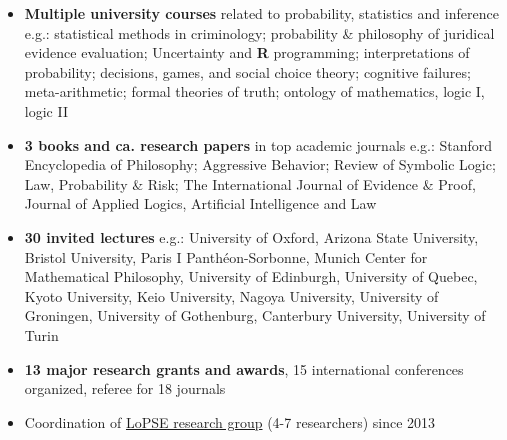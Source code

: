 \documentclass[10pt, a4paper]{article}
\begin{document}
\vspace{-6mm}

\begin{itemize}[leftmargin=*]
	 \setlength{\itemsep}{0pt}\scriptsize
	\item \normalsize  \textbf{Multiple university courses} related to probability, statistics and inference
	\newline
	\scriptsize e.g.: statistical methods in criminology; probability \& philosophy of juridical evidence evaluation; Uncertainty and \textbf{\textsf{R}} programming; interpretations of probability; decisions, games, and social choice theory; cognitive failures; meta-arithmetic; formal theories of truth; ontology of mathematics, logic I, logic II
	
	\item \normalsize  \textbf{3 books and ca. research papers} in top academic journals\newline
	\scriptsize e.g.: Stanford Encyclopedia of Philosophy; Aggressive Behavior; Review of Symbolic Logic; Law, Probability \& Risk; The International Journal of Evidence \& Proof, Journal of Applied Logics, Artificial Intelligence and Law 
	
	\item \normalsize \textbf{30 invited lectures}
	 \newline
	 \scriptsize e.g.: University of Oxford, Arizona State University, Bristol University, Paris I Panth\'eon-Sorbonne, Munich Center for Mathematical Philosophy, University of Edinburgh,  University of Quebec, Kyoto University, Keio University, Nagoya University, University of Groningen, University of Gothenburg,  Canterbury University, University of Turin
	 
	 \vspace{-2mm}	  
	\scriptsize 
	 \item \normalsize  \textbf{13 major research grants and awards}, 15  international conferences organized,   referee for 18  journals
	
	
	\vspace{-2mm} \scriptsize 
	\item \normalsize Coordination of \href{http://lopsegdansk.blogspot.com/p/lopse-team.html}{LoPSE research group} (4-7 researchers) since 2013
		
	
	
\end{itemize}
\thispagestyle{empty}















%
\end{document}
